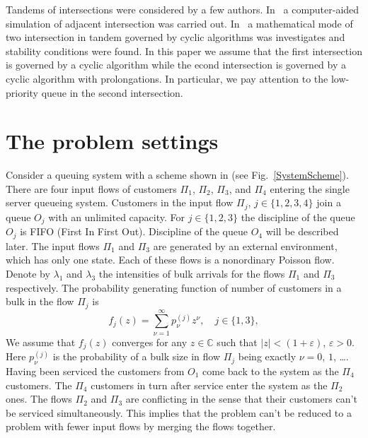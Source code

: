 \documentclass[10pt]{article}
\begin{document}
Tandems of intersections were considered by a few authors. In~\cite{y:l:1985} a computer-aided
simulation of adjacent intersection was carried out. In~\cite{z:2012} a mathematical mode of two
intersection in tandem governed by cyclic algorithms was investigates and stability conditions were
found. In this paper we assume that the first intersection is governed by a cyclic algorithm while
the econd intersection is governed by a cyclic algorithm with prolongations. In particular, we pay
attention to the low-priority queue in the second intersection.

\section{The  problem settings}

Consider a queuing system with a scheme shown in (see Fig.~\ref{SystemScheme}).  There are four
input flows of customers $\Pi_1$, $\Pi_2$, $\Pi_3$, and $\Pi_4$ entering the single server queueing
system. Customers in the input flow $\Pi_j$, $j \in \{1,2,3,4\}$ join a queue $O_j$ with an
unlimited capacity. For $j \in \{1,2,3\}$ the discipline of the queue $O_j$ is FIFO (First In First
Out). Discipline of the queue $O_4$ will be described later. The input flows $\Pi_1$ and $\Pi_3$ are
generated by an external environment, which has only one state. Each of these flows is a nonordinary
Poisson flow. Denote by $\lambda_1$ and $\lambda_3$ the intensities of bulk arrivals for the flows
$\Pi_1$ and $\Pi_3$ respectively. The probability generating function of number of customers in a
bulk in the flow $\Pi_j$ is
\begin{equation}
f_j(z) = \sum_{\nu=1}^{\infty} p_{\nu}^{(j)} z ^{\nu}, \quad j\in \{1,3\},
\label{GeneratingFunc}
\end{equation}
We assume that $f_j(z)$ converges for any $z\in \mathbb{C}$ such that $|z|<(1+\varepsilon)$,
$\varepsilon>0$. Here $p_{\nu}^{(j)}$ is the probability of a bulk size in flow $\Pi_j$ being
exactly $\nu=0$, $1$, \ldots. Having been serviced the customers from $O_1$ come back to the system
as the $\Pi_4$ customers. The $\Pi_4$ customers in turn after service enter the system as the
$\Pi_2$ ones. The flows $\Pi_2$ and $\Pi_3$ are conflicting in the sense that their customers can't
be serviced simultaneously. This implies that the problem can't be reduced to a problem with fewer
input flows by merging the flows together.
\end{document}
